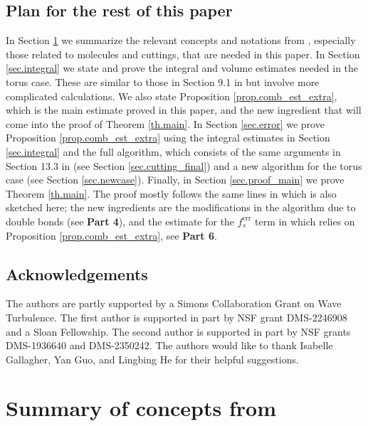 \documentclass[10pt, reqno]{amsart}
\theoremstyle{definition}
\theoremstyle{remark}
\numberwithin{equation}{section}
\begin{document}
\subsection{Plan for the rest of this paper} In Section \ref{sec.summary0} we summarize the relevant concepts and notations from \cite{DHM24}, especially those related to molecules and cuttings, that are needed in this paper. In Section \ref{sec.integral} we state and prove the integral and volume estimates needed in the torus case. These are similar to those in Section 9.1 in \cite{DHM24} but involve more complicated calculations. We also state Proposition \ref{prop.comb_est_extra}, which is the main estimate proved in this paper, and the new ingredient that will come into the proof of Theorem \ref{th.main}. In Section \ref{sec.error} we prove Proposition \ref{prop.comb_est_extra} using the integral estimates in Section \ref{sec.integral} and the full algorithm, which consists of the same arguments in Section 13.3 in \cite{DHM24} (see Section \ref{sec.cutting_final}) and a new algorithm for the torus case (see Section \ref{sec.newcase}). Finally, in Section \ref{sec.proof_main} we prove Theorem \ref{th.main}. The proof mostly follows the same lines in \cite{DHM24} which is also sketched here; the new ingredients are the modifications in the algorithm due to double bonds (see \textbf{Part 4}), and the estimate for the $f_s^{\mathrm{err}}$ term in \cite{DHM24} which relies on Proposition \ref{prop.comb_est_extra}, see \textbf{Part 6}.

\subsection*{Acknowledgements} The authors are partly supported by a Simons Collaboration Grant on Wave Turbulence. The first author is supported in part by NSF grant DMS-2246908 and a Sloan Fellowship. The second author is supported in part by NSF grants DMS-1936640 and DMS-2350242. The authors would like to thank Isabelle Gallagher, Yan Guo, and Lingbing He for their helpful suggestions.
\section{Summary of concepts from \cite{DHM24}}\label{sec.summary0}
\end{document}
